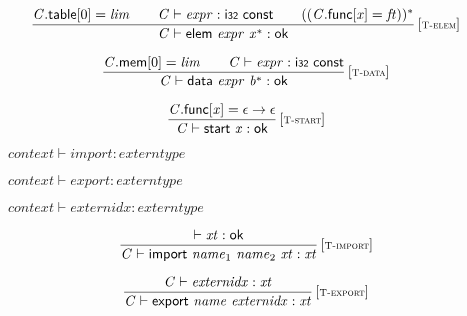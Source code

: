 $$
\begin{array}{@{}c@{}}\displaystyle
\frac{
{\mathit{C}}.\mathsf{table}{}[0] = {\mathit{lim}}
 \qquad
{\mathit{C}} \vdash {\mathit{expr}} : \mathsf{i{\scriptstyle32}}~\mathsf{const}
 \qquad
(({\mathit{C}}.\mathsf{func}{}[{\mathit{x}}] = {\mathit{ft}}))^\ast
}{
{\mathit{C}} \vdash \mathsf{elem}~{\mathit{expr}}~{{\mathit{x}}^\ast} : \mathsf{ok}
} \, {[\textsc{\scriptsize T{-}elem}]}
\qquad
\end{array}
$$

$$
\begin{array}{@{}c@{}}\displaystyle
\frac{
{\mathit{C}}.\mathsf{mem}{}[0] = {\mathit{lim}}
 \qquad
{\mathit{C}} \vdash {\mathit{expr}} : \mathsf{i{\scriptstyle32}}~\mathsf{const}
}{
{\mathit{C}} \vdash \mathsf{data}~{\mathit{expr}}~{{\mathit{b}}^\ast} : \mathsf{ok}
} \, {[\textsc{\scriptsize T{-}data}]}
\qquad
\end{array}
$$

$$
\begin{array}{@{}c@{}}\displaystyle
\frac{
{\mathit{C}}.\mathsf{func}{}[{\mathit{x}}] = \epsilon \rightarrow \epsilon
}{
{\mathit{C}} \vdash \mathsf{start}~{\mathit{x}} : \mathsf{ok}
} \, {[\textsc{\scriptsize T{-}start}]}
\qquad
\end{array}
$$

\vspace{1ex}

$\boxed{{\mathit{context}} \vdash {\mathit{import}} : {\mathit{externtype}}}$

$\boxed{{\mathit{context}} \vdash {\mathit{export}} : {\mathit{externtype}}}$

$\boxed{{\mathit{context}} \vdash {\mathit{externidx}} : {\mathit{externtype}}}$

$$
\begin{array}{@{}c@{}}\displaystyle
\frac{
{ \vdash }\;{\mathit{xt}} : \mathsf{ok}
}{
{\mathit{C}} \vdash \mathsf{import}~{\mathit{name}}_{{1}}~{\mathit{name}}_{{2}}~{\mathit{xt}} : {\mathit{xt}}
} \, {[\textsc{\scriptsize T{-}import}]}
\qquad
\end{array}
$$

$$
\begin{array}{@{}c@{}}\displaystyle
\frac{
{\mathit{C}} \vdash {\mathit{externidx}} : {\mathit{xt}}
}{
{\mathit{C}} \vdash \mathsf{export}~{\mathit{name}}~{\mathit{externidx}} : {\mathit{xt}}
} \, {[\textsc{\scriptsize T{-}export}]}
\qquad
\end{array}
$$

\vspace{1ex}


